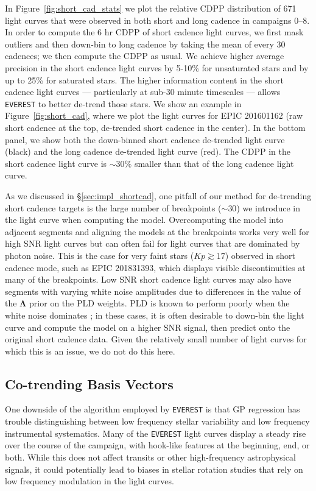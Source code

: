 \documentclass[]{emulateapj}
\newcommand{\Kp}{\ensuremath{Kp}}
\newcommand{\edited}[1]{{\color{red} #1}}
\begin{document}
In Figure~\ref{fig:short_cad_stats} we plot the relative CDPP distribution of
671 light curves that were observed in both short and long cadence \edited{in campaigns 0--8}. In order to
compute the 6 hr CDPP of short cadence light curves, we first mask outliers and then
down-bin to long cadence by taking the mean of every 30 cadences; we then compute
the CDPP as usual. We achieve higher average precision in the short cadence light
curves by 5-10\% for unsaturated stars and by up to 25\% for saturated stars. The
higher information content in the short cadence light curves --- particularly
at sub-30 minute timescales --- allows \texttt{EVEREST} to better de-trend those stars.
We show an example in Figure~\ref{fig:short_cad}, where we plot the light curves
for EPIC 201601162 (raw short cadence at the top, de-trended short cadence in the
center). In the bottom panel, we show both the down-binned short cadence de-trended light
curve (black) and the long cadence de-trended light curve (red). The CDPP in the short
cadence light curve is ${\sim}30\%$ smaller than that of the long cadence light curve.

As we discussed in \S\ref{sec:impl_shortcad}, one pitfall of our method for de-trending
short cadence targets is the large number of breakpoints (${\sim}30$) we introduce
in the light curve when computing the model. Overcomputing the model into adjacent
segments and aligning the models at the breakpoints works very well for high
SNR light curves but can often fail for light curves that are dominated by photon
noise. This is the case for very faint stars ($\Kp \gtrsim 17$) observed in
short cadence mode, such as EPIC 201831393, which displays visible discontinuities
at many of the breakpoints. Low SNR short cadence light curves may also have segments
with varying white noise amplitudes due to differences in the value of the $\mathbf{\Lambda}$
prior on the PLD weights. PLD is known to perform poorly when the white noise dominates
\citep{Deming15}; in these cases, it is often desirable to down-bin the light curve and
compute the model on a higher SNR signal, then predict onto the original short cadence
data. Given the relatively small number of light curves for which this is an issue,
we do not do this here.

\subsection{Co-trending Basis Vectors}
\label{sec:cbvs}
One downside of the algorithm employed by \texttt{EVEREST} is that GP regression has trouble
distinguishing between low frequency stellar variability and low frequency instrumental
systematics. Many of the \texttt{EVEREST} light curves display a steady rise over the
course of the campaign, with hook-like features at the beginning, end, or both. While this
does not affect transits or other high-frequency astrophysical signals, it could potentially
lead to biases in stellar rotation studies that rely on low frequency modulation in the
light curves.
\end{document}
